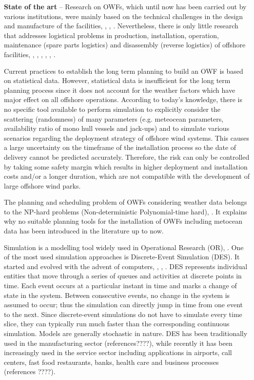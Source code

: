 \textbf{State of the art} --
Research on OWFs, which until now has been carried out by various institutions, were mainly based on the technical challenges in the design and manufacture of the facilities, \cite{Miller2013}, \cite{SerranoGonzalez2014}, \cite{Perveen2014}. Nevertheless, there is only little research that addresses logistical problems in production, installation, operation, maintenance (spare parts logistics) and disassembly (reverse logistics) of offshore facilities, \cite{Scholz2010}, \cite{Lange2012}, \cite{COMPIT11}, \cite{COMPIT12}, \cite{aitsimulation}, \cite{thalji2012}.

Current practices to establish the long term planning to build an OWF is based on statistical data. However, statistical data is insufficient for the long term planning process since it does not account for the weather factors which have major effect on all offshore operations. According to today’s knowledge, there is no specific tool available to perform simulation to explicitly consider the scattering (randomness) of many parameters (e.g. meteocean parameters, availability ratio of mono hull vessels and jack-ups) and to simulate various scenarios regarding the deployment strategy of offshore wind systems. This causes a large uncertainty on the timeframe of the installation process so the date of delivery cannot be predicted accurately. Therefore, the risk can only be controlled by taking some safety margin which results in higher deployment and installation costs and/or a longer duration, which are not compatible with the development of large offshore wind parks.

The planning and scheduling problem of OWFs considering weather data belongs to the NP-hard problems (Non-deterministic Polynomial-time hard), \cite{leeuwen1990}. It explains why no suitable planning tools for the installation of OWFs including metocean data has been introduced in the literature up to now.

Simulation is a modelling tool widely used in Operational Research (OR), \cite{pidd2005computer}. One of the most used simulation approaches is Discrete-Event Simulation (DES). It started and evolved with the advent of computers, \cite{Myron1987}, \cite {William1988}, \cite{robinson2005}. DES represents individual entities that move through a series of queues and activities at discrete points in time. Each event occurs at a particular instant in time and marks a change of state in the system. Between consecutive events, no change in the system is assumed to occur; thus the simulation can directly jump in time from one event to the next. Since discrete-event simulations do not have to simulate every time slice, they can typically run much faster than the corresponding continuous simulation. Models are generally stochastic in nature. DES has been traditionally used in the manufacturing sector \cite{KhedriLiraviasl20151490} (references????), while recently it has been increasingly used in the service sector including applications in airports, call centers, fast food restaurants, banks, health care \cite{Chemweno201445} and business processes (references ????).

